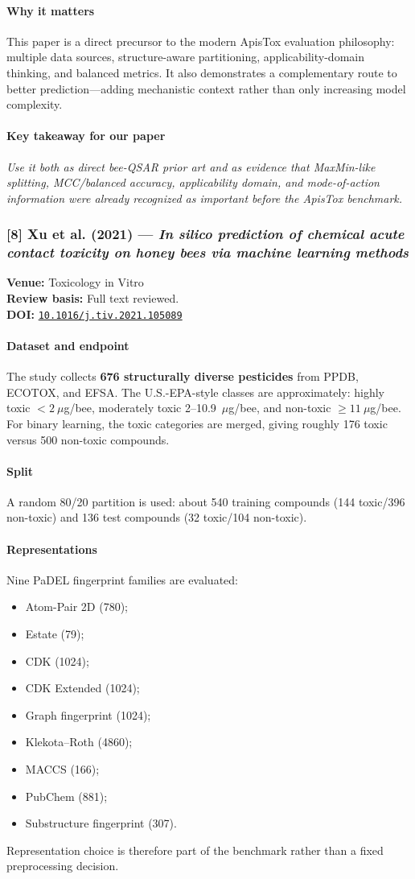 \documentclass[11pt]{article}
\newcommand{\reviewfield}[2]{\paragraph{#1}#2}
\newcommand{\keytakeaway}[1]{\paragraph{Key takeaway for our paper}\emph{#1}}
\newcommand{\paperdoi}[1]{\href{https://doi.org/#1}{\texttt{#1}}}
\begin{document}
\reviewfield{Why it matters}{
This paper is a direct precursor to the modern ApisTox evaluation philosophy: multiple data sources, structure-aware partitioning, applicability-domain thinking, and balanced metrics. It also demonstrates a complementary route to better prediction---adding mechanistic context rather than only increasing model complexity.
}

\keytakeaway{Use it both as direct bee-QSAR prior art and as evidence that MaxMin-like splitting, MCC/balanced accuracy, applicability domain, and mode-of-action information were already recognized as important before the ApisTox benchmark.}

\subsubsection{[8] Xu et al. (2021) --- \textit{In silico prediction of chemical acute contact toxicity on honey bees via machine learning methods}}
\textbf{Venue:} Toxicology in Vitro\\
\textbf{Review basis:} Full text reviewed.\\
\textbf{DOI:} \paperdoi{10.1016/j.tiv.2021.105089}

\reviewfield{Dataset and endpoint}{
The study collects \textbf{676 structurally diverse pesticides} from PPDB, ECOTOX, and EFSA. The U.S.-EPA-style classes are approximately: highly toxic $<2~\mu$g/bee, moderately toxic 2--10.9~$\mu$g/bee, and non-toxic $\geq11~\mu$g/bee. For binary learning, the toxic categories are merged, giving roughly 176 toxic versus 500 non-toxic compounds.
}

\reviewfield{Split}{
A random 80/20 partition is used: about 540 training compounds (144 toxic/396 non-toxic) and 136 test compounds (32 toxic/104 non-toxic).
}

\reviewfield{Representations}{
Nine PaDEL fingerprint families are evaluated:
\begin{itemize}
    \item Atom-Pair 2D (780);
    \item Estate (79);
    \item CDK (1024);
    \item CDK Extended (1024);
    \item Graph fingerprint (1024);
    \item Klekota--Roth (4860);
    \item MACCS (166);
    \item PubChem (881);
    \item Substructure fingerprint (307).
\end{itemize}
Representation choice is therefore part of the benchmark rather than a fixed preprocessing decision.
}
\end{document}
